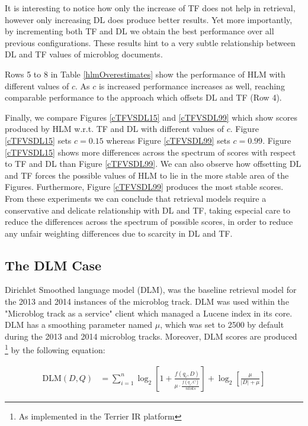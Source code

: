 It is interesting to notice how only the increase of TF does not help in retrieval, however only increasing DL does produce better results. Yet more importantly, by incrementing both TF and DL we obtain the best performance over all previous configurations. These results hint to a very subtle relationship between DL and TF values of microblog documents. 

Rows 5 to 8 in Table \ref{hlmOverestimates} show the performance of HLM with different values of $c$. As $c$ is increased performance increases as well, reaching comparable performance to the approach which offsets DL and TF (Row 4).

Finally, we compare Figures \ref{cTFVSDL15} and \ref{cTFVSDL99} which show scores produced by HLM w.r.t. TF and DL with different values of $c$. Figure \ref{cTFVSDL15} sets $c=0.15$ whereas Figure \ref{cTFVSDL99} sets $c=0.99$. Figure \ref{cTFVSDL15} shows more differences across the spectrum of scores with respect to TF and DL than Figure \ref{cTFVSDL99}. We can also observe how offsetting DL and TF forces the possible values of HLM to lie in the more stable area of the Figures. Furthermore, Figure \ref{cTFVSDL99} produces the most stable scores. From these experiments we can conclude that retrieval models require a conservative and delicate relationship with DL and TF, taking especial care to reduce the differences across the spectrum of possible scores, in order to reduce any unfair weighting differences due to scarcity in DL and TF.

\subsection{The DLM Case}
Dirichlet Smoothed language model (DLM), was the baseline retrieval model for the 2013 and 2014 instances of the microblog track. DLM was used within the "Microblog track as a service" client which managed a Lucene index in its core. DLM has a smoothing parameter named $\mu$, which was set to 2500 by default during the 2013 and 2014 microblog tracks. Moreover, DLM scores are produced \footnote{As implemented in the Terrier IR platform} by the following equation:

\begin{small}
\begin{align}
\label{dlmformula}
    \text{DLM}(D,Q) &= \sum_{i=1}^{n} \log_2 \left[ 1 + \frac{f(q_i, D)}{\mu \cdot \frac{ f(q_i, C) }{ ntoks }}\right] + \log_2 \left[\frac{\mu}{|D| + \mu}\right]
\end{align}
\label{dlmequation}
\end{small}


